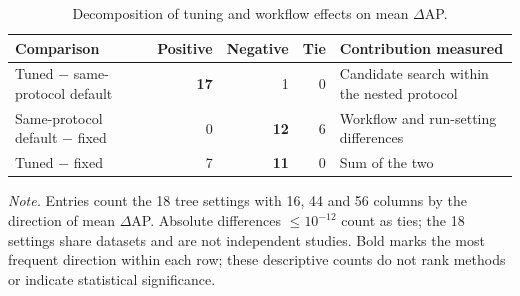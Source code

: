 \begin{table}[htbp]
\centering
\footnotesize
\caption{Decomposition of tuning and workflow effects on mean $\Delta$AP.}
\label{tab:decomp}
\begin{threeparttable}
\begin{tabular}{lrrrp{4.6cm}}
\toprule
Comparison & Positive & Negative & Tie & Contribution measured \\
\midrule
Tuned $-$ same-protocol default & \textbf{17} & 1 & 0 & Candidate search within the nested protocol \\
Same-protocol default $-$ fixed & 0 & \textbf{12} & 6 & Workflow and run-setting differences \\
Tuned $-$ fixed & 7 & \textbf{11} & 0 & Sum of the two \\
\bottomrule
\end{tabular}
\begin{tablenotes}[flushleft]
\footnotesize
\setlength{\labelsep}{0pt}\item[] \textit{Note.} Entries count the 18 tree settings with 16, 44 and 56 columns by the direction of mean $\Delta$AP. Absolute differences $\le10^{-12}$ count as ties; the 18 settings share datasets and are not independent studies. Bold marks the most frequent direction within each row; these descriptive counts do not rank methods or indicate statistical significance.
\end{tablenotes}
\end{threeparttable}
\end{table}
